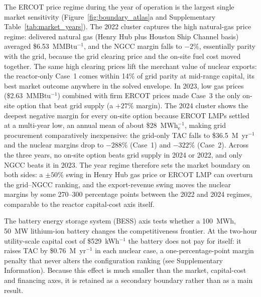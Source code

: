 \documentclass[sn-vancouver,Numbered]{sn-jnl}%
\begin{document}
The ERCOT price regime during the year of operation is the largest single market sensitivity (Figure~\ref{fig:boundary_atlas}a and Supplementary Table~\ref{tab:market_years}). The 2022 cluster captures the high natural-gas price regime: delivered natural gas (Henry Hub plus Houston Ship Channel basis) averaged \$6.53~MMBtu$^{-1}$, and the NGCC margin falls to $-2\%$, essentially parity with the grid, because the grid clearing price and the on-site fuel cost moved together. The same high clearing prices lift the merchant value of nuclear exports: the reactor-only Case~1 comes within 14\% of grid parity at mid-range capital, its best market outcome anywhere in the solved envelope. In 2023, low gas prices (\$2.63~MMBtu$^{-1}$) combined with firm ERCOT prices made Case~3 the only on-site option that beat grid supply (a $+27\%$ margin). The 2024 cluster shows the deepest negative margin for every on-site option because ERCOT LMPs settled at a multi-year low, an annual mean of about \$28~MWh$_\mathrm{e}^{-1}$, making grid procurement comparatively inexpensive: the grid-only TAC falls to \$36.5~M~yr$^{-1}$ and the nuclear margins drop to $-288\%$ (Case~1) and $-322\%$ (Case~2). Across the three years, no on-site option beats grid supply in 2024 or 2022, and only NGCC beats it in 2023. The year regime therefore sets the market boundary on both sides: a $\pm 50\%$ swing in Henry Hub gas price or ERCOT LMP can overturn the grid--NGCC ranking, and the export-revenue swing moves the nuclear margins by some 270--300 percentage points between the 2022 and 2024 regimes, comparable to the reactor capital-cost axis itself.

The battery energy storage system (BESS) axis tests whether a 100~MWh, 50~MW lithium-ion battery changes the competitiveness frontier. At the two-hour utility-scale capital cost of \$529~kWh$^{-1}$ the battery does not pay for itself: it raises TAC by \$0.76~M~yr$^{-1}$ in each nuclear case, a one-percentage-point margin penalty that never alters the configuration ranking (see Supplementary Information). Because this effect is much smaller than the market, capital-cost and financing axes, it is retained as a secondary boundary rather than as a main result.
\end{document}
